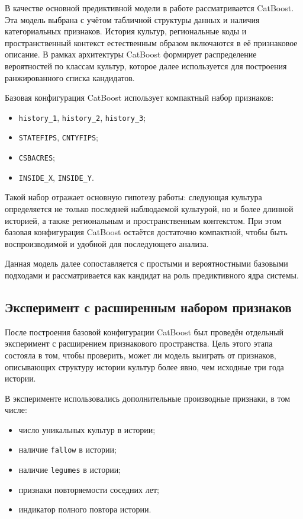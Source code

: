 В качестве основной предиктивной модели в работе рассматривается CatBoost. Эта модель выбрана с учётом табличной
структуры данных и наличия категориальных признаков. История культур, региональные коды и пространственный контекст
естественным образом включаются в её признаковое описание. В рамках архитектуры CatBoost формирует распределение
вероятностей по классам культур, которое далее используется для построения ранжированного списка кандидатов.

Базовая конфигурация CatBoost использует компактный набор признаков:

\begin{itemize}
\tightlist
\item
  \texttt{history\_1}, \texttt{history\_2}, \texttt{history\_3};
\item
  \texttt{STATEFIPS}, \texttt{CNTYFIPS};
\item
  \texttt{CSBACRES};
\item
  \texttt{INSIDE\_X}, \texttt{INSIDE\_Y}.
\end{itemize}

Такой набор отражает основную гипотезу работы: следующая культура определяется не только последней наблюдаемой
культурой, но и более длинной историей, а также региональным и пространственным контекстом. При этом базовая
конфигурация CatBoost остаётся достаточно компактной, чтобы быть воспроизводимой и удобной для последующего анализа.

Данная модель далее сопоставляется с простыми и вероятностными базовыми подходами и рассматривается как кандидат на роль
предиктивного ядра системы.

\subsection{Эксперимент с расширенным набором признаков}

После построения базовой конфигурации CatBoost был проведён отдельный эксперимент с расширением признакового
пространства. Цель этого этапа состояла в том, чтобы проверить, может ли модель выиграть от признаков, описывающих
структуру истории культур более явно, чем исходные три года истории.

В эксперименте использовались дополнительные производные признаки, в том числе:

\begin{itemize}
\tightlist
\item
  число уникальных культур в истории;
\item
  наличие \texttt{fallow} в истории;
\item
  наличие \texttt{legumes} в истории;
\item
  признаки повторяемости соседних лет;
\item
  индикатор полного повтора истории.
\end{itemize}

